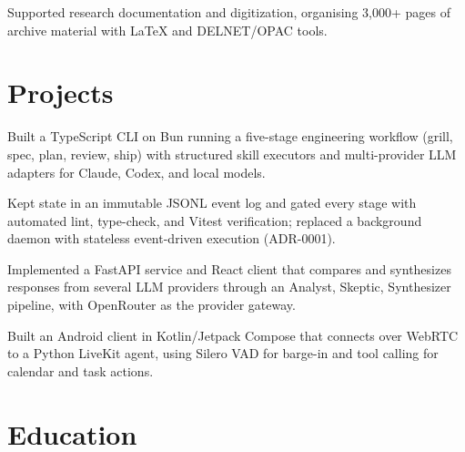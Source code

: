 \documentclass{../../../templates/v3/resume-openfont}
\begin{document}
\begin{resumeitemize}
\item Supported research documentation and digitization, organising 3{,}000+ pages of archive material with LaTeX and DELNET/OPAC tools.
\end{resumeitemize}

\section{Projects}
\begin{resumeitemize}
\item Built a TypeScript CLI on Bun running a five-stage engineering workflow (grill, spec, plan, review, ship) with structured skill executors and multi-provider LLM adapters for Claude, Codex, and local models.
\item Kept state in an immutable JSONL event log and gated every stage with automated lint, type-check, and Vitest verification; replaced a background daemon with stateless event-driven execution (ADR-0001).
\end{resumeitemize}

\begin{resumeitemize}
\item Implemented a FastAPI service and React client that compares and synthesizes responses from several LLM providers through an Analyst, Skeptic, Synthesizer pipeline, with OpenRouter as the provider gateway.
\end{resumeitemize}

\begin{resumeitemize}
\item Built an Android client in Kotlin/Jetpack Compose that connects over WebRTC to a Python LiveKit agent, using Silero VAD for barge-in and tool calling for calendar and task actions.
\end{resumeitemize}

\section{Education}
\end{document}
